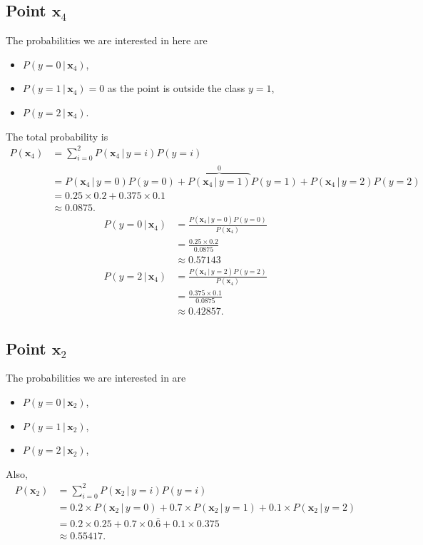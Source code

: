 \documentclass[10pt]{article}
\begin{document}
\subsection*{Point $\textbf{x}_4$}
The probabilities we are interested in here are
\begin{itemize}
  \item $P(y = 0 \, | \, \textbf{x}_4)$,
  \item $P(y = 1 \, | \, \textbf{x}_4) = 0$ as the point is outside the class $y = 1$,
  \item $P(y = 2 \, | \, \textbf{x}_4)$.
\end{itemize}
The total probability is
\begin{align*}
P(\textbf{x}_4) &= \sum_{i = 0}^2 P(\textbf{x}_4 \, | \, y = i)P(y = i) \\
                    &= P(\textbf{x}_4 \, | \, y = 0) P(y = 0) + \overbrace{P(\textbf{x}_4 \, | \, y = 1)}^0 P(y = 1) + P(\textbf{x}_4 \, | \, y = 2)P(y = 2) \\
                    &= 0.25 \times 0.2 + 0.375 \times 0.1 \\
                    &\approx 0.0875.
\end{align*}
\begin{align*}
P(y = 0 \, | \, \textbf{x}_4) &= \frac{ P( \textbf{x}_4 \, | \, y = 0)P(y = 0)}{ P(\textbf{x}_4) } \\
                                          &= \frac{ 0.25 \times 0.2}{0.0875} \\
                                          &\approx 0.57143 \\
P(y = 2 \, | \, \textbf{x}_4) &= \frac{P(\textbf{x}_4 \, | \, y = 2)P(y = 2)}{ P(\textbf{x}_4) } \\
                                          &= \frac{0.375 \times 0.1}{0.0875} \\
                                          &\approx 0.42857. 
\end{align*}
\subsection*{Point $\textbf{x}_2$}
The probabilities we are interested in are
\begin{itemize}
 \item $P(y = 0 \, | \, \textbf{x}_2)$,
 \item $P(y = 1 \, | \, \textbf{x}_2)$,
 \item $P(y = 2 \, | \, \textbf{x}_2)$,
\end{itemize}
Also,
\begin{align*}
P(\textbf{x}_2) &= \sum_{i = 0}^2 P(\textbf{x}_2 \, | \, y = i) P(y = i) \\
                    &= 0.2 \times P(\textbf{x}_2 \, | \,  y = 0) + 0.7 \times P(\textbf{x}_2 \, | \, y = 1) + 0.1 \times P(\textbf{x}_2 \, | \, y = 2) \\
                    &= 0.2 \times 0.25 + 0.7 \times 0.\bar{6} + 0.1 \times 0.375 \\
                    &\approx 0.55417.
\end{align*}
\end{document}
